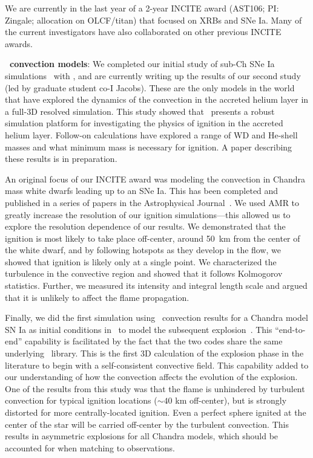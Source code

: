 \documentclass[11pt,letterpaper,english]{article}
\begin{document}
We are currently in the last year of a 2-year INCITE award (AST106;
PI: Zingale; allocation on OLCF/titan) that focused on XRBs and SNe
Ia.  Many of the current investigators have also collaborated on other
previous INCITE awards.  

{\bf \maestro\ convection models}:
%
We completed our initial study of sub-Ch SNe Ia
simulations~\cite{Zin13} with \maestro, and are currently writing up
the results of our second study (led by graduate student co-I Jacobs).
These are the only models in the world that have explored the dynamics
of the convection in the accreted helium layer in a full-3D resolved
simulation.  This study showed that \maestro\ presents a robust
simulation platform for investigating the physics of ignition in the
accreted helium layer.  Follow-on calculations have explored a range
of WD and He-shell masses and what minimum mass is necessary for
ignition.  A paper describing these results is in preparation.

An original focus of our INCITE award was modeling the convection in
Chandra mass white dwarfs leading up to an SNe Ia.  This has been
completed and published in a series of
papers in the Astrophysical Journal~\cite{Zingale:2011,Non12}.  We
used AMR to greatly increase the resolution of
our ignition simulations---this allowed us to explore the resolution
dependence of our results.  We demonstrated that the ignition is most
likely to take place off-center, around 50~km from the center of the
white dwarf, and by following hotspots as they develop in the flow, we
showed that ignition is likely only at a single point.  We
characterized the turbulence in the convective region and showed that
it follows Kolmogorov statistics.  Further, we measured its intensity
and integral length scale and argued that it is unlikely to affect the
flame propagation.

Finally, we did the first simulation using \maestro\ convection
results for a Chandra model SN Ia as initial conditions in \castro\ to
model the subsequent explosion~\cite{Mal14}.  This ``end-to-end''
capability is facilitated by the fact that the two codes share the
same underlying \boxlib\ library.  This is the first 3D calculation of the 
explosion phase in the 
literature to begin with a self-consistent convective field.  This capability added to our understanding
of how the convection affects the evolution of the explosion.  One of
the results from this study was that the flame is unhindered by
turbulent convection for typical ignition locations ($\sim 40$ km
off-center), but is strongly distorted for more centrally-located
ignition.  Even a perfect sphere ignited at the center of the star
will be carried off-center by the turbulent convection.  This results
in asymmetric explosions for all Chandra models, which should be
accounted for when matching to observations.
\end{document}
